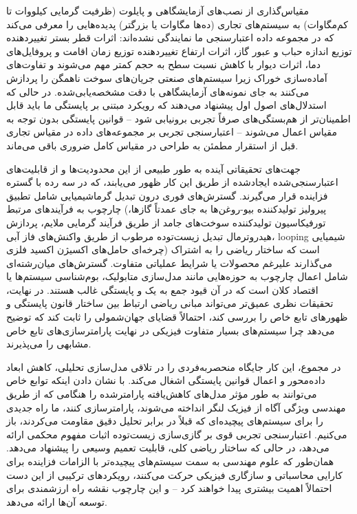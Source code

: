 \documentclass[12pt, a4paper]{article}
\begin{document}
مقیاس‌گذاری از نصب‌های آزمایشگاهی و پایلوت (ظرفیت گرمایی کیلووات تا کم‌مگاوات) به سیستم‌های تجاری (ده‌ها مگاوات یا بزرگتر) پدیده‌هایی را معرفی می‌کند که در مجموعه داده اعتبارسنجی ما نمایندگی نشده‌اند: اثرات قطر بستر تغییردهنده توزیع اندازه حباب و عبور گاز، اثرات ارتفاع تغییردهنده توزیع زمان اقامت و پروفایل‌های دما، اثرات دیوار با کاهش نسبت سطح به حجم کمتر مهم می‌شوند و تفاوت‌های آماده‌سازی خوراک زیرا سیستم‌های صنعتی جریان‌های سوخت ناهمگن را پردازش می‌کنند به جای نمونه‌های آزمایشگاهی با دقت مشخصه‌یابی‌شده. در حالی که استدلال‌های اصول اول پیشنهاد می‌دهند که رویکرد مبتنی بر پایستگی ما باید قابل اطمینان‌تر از هم‌بستگی‌های صرفاً تجربی برونیابی شود – قوانین پایستگی بدون توجه به مقیاس اعمال می‌شوند – اعتبارسنجی تجربی بر مجموعه‌های داده در مقیاس تجاری قبل از استقرار مطمئن به طراحی در مقیاس کامل ضروری باقی می‌ماند.

جهت‌های تحقیقاتی آینده به طور طبیعی از این محدودیت‌ها و از قابلیت‌های اعتبارسنجی‌شده ایجادشده از طریق این کار ظهور می‌یابند، که در سه رده با گستره فزاینده قرار می‌گیرند. گسترش‌های فوری درون تبدیل گرماشیمیایی شامل تطبیق چارچوب به فرآیندهای مرتبط (پیرولیز تولیدکننده بیو-روغن‌ها به جای عمدتاً گازها، تورفیکاسیون تولیدکننده سوخت‌های جامد از طریق فرآیند گرمایی ملایم، پردازش هیدروترمال تبدیل زیست‌توده مرطوب از طریق واکنش‌های فاز آبی، looping شیمیایی چرخه‌ای حامل‌های اکسیژن اکسید فلزی) است که ساختار ریاضی را به اشتراک می‌گذارند علیرغم محصولات یا شرایط عملیاتی متفاوت. گسترش‌های میان‌رشته‌ای شامل اعمال چارچوب به حوزه‌هایی مانند مدل‌سازی متابولیک، بوم‌شناسی سیستم‌ها یا اقتصاد کلان است که در آن قیود جمع به یک و پایستگی غالب هستند. در نهایت، تحقیقات نظری عمیق‌تر می‌تواند مبانی ریاضی ارتباط بین ساختار قانون پایستگی و ظهورهای تابع خاص را بررسی کند، احتمالاً قضایای جهان‌شمولی را ثابت کند که توضیح می‌دهد چرا سیستم‌های بسیار متفاوت فیزیکی در نهایت پارامترسازی‌های تابع خاص مشابهی را می‌پذیرند.

در مجموع، این کار جایگاه منحصربه‌فردی را در تلاقی مدل‌سازی تحلیلی، کاهش ابعاد داده‌محور و اعمال قوانین پایستگی اشغال می‌کند. با نشان دادن اینکه توابع خاص می‌توانند به طور مؤثر مدل‌های کاهش‌یافته پارامترشده را هنگامی که از طریق مهندسی ویژگی آگاه از فیزیک لنگر انداخته می‌شوند، پارامترسازی کنند، ما راه جدیدی را برای سیستم‌های پیچیده‌ای که قبلاً در برابر تحلیل دقیق مقاومت می‌کردند، باز می‌کنیم. اعتبارسنجی تجربی قوی بر گازی‌سازی زیست‌توده اثبات مفهوم محکمی ارائه می‌دهد، در حالی که ساختار ریاضی کلی، قابلیت تعمیم وسیعی را پیشنهاد می‌دهد. همان‌طور که علوم مهندسی به سمت سیستم‌های پیچیده‌تر با الزامات فزاینده برای کارایی محاسباتی و سازگاری فیزیکی حرکت می‌کنند، رویکردهای ترکیبی از این دست احتمالاً اهمیت بیشتری پیدا خواهند کرد – و این چارچوب نقشه راه ارزشمندی برای توسعه آن‌ها ارائه می‌دهد.
\end{document}
